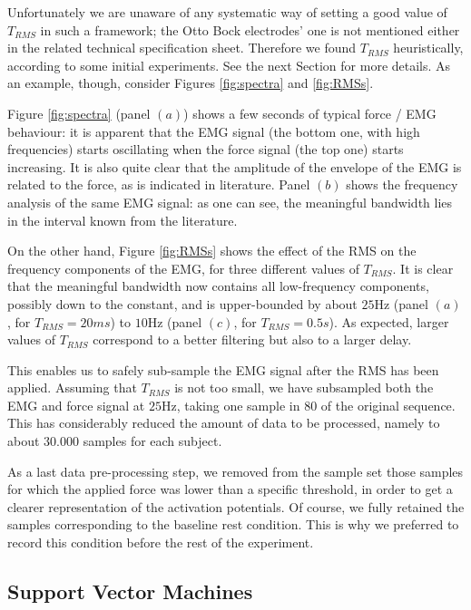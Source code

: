 Unfortunately we are unaware of any systematic way of setting a good
value of $T_{RMS}$ in such a framework; the Otto Bock electrodes' one
is not mentioned either in the related technical specification
sheet. Therefore we found $T_{RMS}$ heuristically, according to some
initial experiments. See the next Section for more details. As an
example, though, consider Figures \ref{fig:spectra} and
\ref{fig:RMSs}.

Figure \ref{fig:spectra} (panel $(a)$) shows a few seconds of typical
force / EMG behaviour: it is apparent that the EMG signal (the bottom
one, with high frequencies) starts oscillating when the force signal
(the top one) starts increasing. It is also quite clear that the
amplitude of the envelope of the EMG is related to the force, as is
indicated in literature. Panel $(b)$ shows the frequency analysis of
the same EMG signal: as one can see, the meaningful bandwidth lies in
the interval known from the literature.

On the other hand, Figure \ref{fig:RMSs} shows the effect of the RMS
on the frequency components of the EMG, for three different values of
$T_{RMS}$. It is clear that the meaningful bandwidth now contains all
low-frequency components, possibly down to the constant, and is
upper-bounded by about $25$Hz (panel $(a)$, for $T_{RMS}=20ms$) to
$10$Hz (panel $(c)$, for $T_{RMS}=0.5s$). As expected, larger values
of $T_{RMS}$ correspond to a better filtering but also to a larger
delay.

This enables us to safely sub-sample the EMG signal after the RMS has
been applied. Assuming that $T_{RMS}$ is not too small, we have
subsampled both the EMG and force signal at $25$Hz, taking one sample
in $80$ of the original sequence. This has considerably reduced the
amount of data to be processed, namely to about $30.000$ samples for
each subject.

As a last data pre-processing step, we removed from the sample set
those samples for which the applied force was lower than a specific
threshold, in order to get a clearer representation of the activation
potentials. Of course, we fully retained the samples corresponding to
the baseline rest condition. This is why we preferred to record this
condition before the rest of the experiment.

\subsection{Support Vector Machines}

